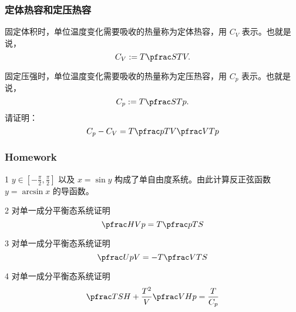 \documentclass[CJK,13pt]{beamer}
\begin{document}
\begin{frame}
  \frametitle{定体热容和定压热容}
  固定体积时，单位温度变化需要吸收的热量称为定体热容，用 $C_V$ 表示。也就是说，
{\blue  $$C_V := T\pfrac STV. $$}

  \skipline
  
  固定压强时，单位温度变化需要吸收的热量称为定压热容，用 $C_p$ 表示。也就是说，
  {\blue $$ C_p := T\pfrac STp.$$}
  请证明：
  $$ C_p - C_V = T\pfrac pTV \pfrac VTp $$
\end{frame}


\begin{frame}
  \frametitle{Homework}
  \bitem
\item[1]{$y\in[-\frac{\pi}{2},\frac{\pi}{2}]$ 以及 $x=\sin y$ 构成了单自由度系统。由此计算反正弦函数 $y=\arcsin x$ 的导函数。}
\item[2]{对单一成分平衡态系统证明 $$\pfrac HVp = T\pfrac pTS $$}
\item[3]{对单一成分平衡态系统证明 $$\pfrac UpV = -T\pfrac VTS$$}
\item[4]{对单一成分平衡态系统证明 $$\pfrac TSH +\frac{T^2}{V} \pfrac VHp = \frac{T}{C_p} $$
  }  
  \eitem
\end{frame}

\ech
\end{document}
